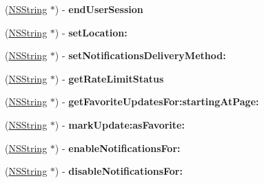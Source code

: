 \begin{DoxyCompactItemize}
\item 
\hypertarget{interface_m_g_twitter_engine_acb2e2bd41aafada909bfabd60c9e61de}{
(\hyperlink{class_n_s_string}{\-N\-S\-String} $\ast$) -\/ {\bfseries end\-User\-Session}}
\label{interface_m_g_twitter_engine_acb2e2bd41aafada909bfabd60c9e61de}

\item 
\hypertarget{interface_m_g_twitter_engine_a1e3a796f8dcf1d305cfd005eb509b49a}{
(\hyperlink{class_n_s_string}{\-N\-S\-String} $\ast$) -\/ {\bfseries set\-Location\-:}}
\label{interface_m_g_twitter_engine_a1e3a796f8dcf1d305cfd005eb509b49a}

\item 
\hypertarget{interface_m_g_twitter_engine_a8c669251e204ed7eaea3b0e7cafcd926}{
(\hyperlink{class_n_s_string}{\-N\-S\-String} $\ast$) -\/ {\bfseries set\-Notifications\-Delivery\-Method\-:}}
\label{interface_m_g_twitter_engine_a8c669251e204ed7eaea3b0e7cafcd926}

\item 
\hypertarget{interface_m_g_twitter_engine_add8d28f4ced666f4019774fe42bb8a4d}{
(\hyperlink{class_n_s_string}{\-N\-S\-String} $\ast$) -\/ {\bfseries get\-Rate\-Limit\-Status}}
\label{interface_m_g_twitter_engine_add8d28f4ced666f4019774fe42bb8a4d}

\item 
\hypertarget{interface_m_g_twitter_engine_a9ed6e1d90d6005ae8bed71d8a6998ebe}{
(\hyperlink{class_n_s_string}{\-N\-S\-String} $\ast$) -\/ {\bfseries get\-Favorite\-Updates\-For\-:starting\-At\-Page\-:}}
\label{interface_m_g_twitter_engine_a9ed6e1d90d6005ae8bed71d8a6998ebe}

\item 
\hypertarget{interface_m_g_twitter_engine_af22def121aeacf357915b6da4b171369}{
(\hyperlink{class_n_s_string}{\-N\-S\-String} $\ast$) -\/ {\bfseries mark\-Update\-:as\-Favorite\-:}}
\label{interface_m_g_twitter_engine_af22def121aeacf357915b6da4b171369}

\item 
\hypertarget{interface_m_g_twitter_engine_a132710c7d7b694aefd78b28787f470f4}{
(\hyperlink{class_n_s_string}{\-N\-S\-String} $\ast$) -\/ {\bfseries enable\-Notifications\-For\-:}}
\label{interface_m_g_twitter_engine_a132710c7d7b694aefd78b28787f470f4}

\item 
\hypertarget{interface_m_g_twitter_engine_a40927ce94a890465fdcab57422cbfc0d}{
(\hyperlink{class_n_s_string}{\-N\-S\-String} $\ast$) -\/ {\bfseries disable\-Notifications\-For\-:}}
\label{interface_m_g_twitter_engine_a40927ce94a890465fdcab57422cbfc0d}


\end{DoxyCompactItemize}
